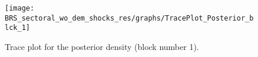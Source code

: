 \begin{figure}[H]
\centering
  \texttt{[image: BRS\_sectoral\_wo\_dem\_shocks\_res/graphs/TracePlot\_Posterior\_blck\_1]}\\
    \caption{Trace plot for the posterior density (block number 1).}
\end{figure}
